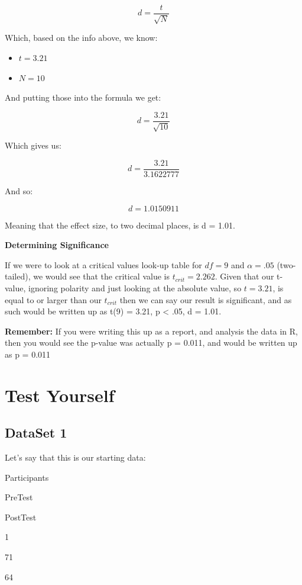 \documentclass[
  oneside]{book}
\providecommand{\tightlist}{%
  \setlength{\itemsep}{0pt}\setlength{\parskip}{0pt}}
\begin{document}
\[d = \frac{t}{\sqrt{N}}\]

Which, based on the info above, we know:

\begin{itemize}
\tightlist
\item
  \(t = 3.21\)
\item
  \(N = 10\)
\end{itemize}

And putting those into the formula we get:

\[d = \frac{3.21}{\sqrt{10}}\]

Which gives us:

\[d = \frac{3.21}{3.1622777}\]

And so:

\[d = 1.0150911\]

Meaning that the effect size, to two decimal places, is d = 1.01.

\textbf{Determining Significance}

If we were to look at a critical values look-up table for \(df = 9\) and \(\alpha = .05\) (two-tailed), we would see that the critical value is \(t_{crit} = 2.262\). Given that our t-value, ignoring polarity and just looking at the absolute value, so \(t = 3.21\), is equal to or larger than our \(t_{crit}\) then we can say our result is significant, and as such would be written up as t(9) = 3.21, p \textless{} .05, d = 1.01.

\textbf{Remember:} If you were writing this up as a report, and analysis the data in R, then you would see the p-value was actually p = 0.011, and would be written up as p = 0.011

\hypertarget{test-yourself-3}{%
\section{Test Yourself}\label{test-yourself-3}}

\hypertarget{dataset-1-3}{%
\subsection{DataSet 1}\label{dataset-1-3}}

Let's say that this is our starting data:

Participants

PreTest

PostTest

1

71

64
\end{document}
